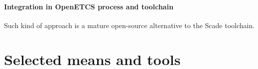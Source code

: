 \paragraph{Integration in OpenETCS process and toolchain}

Such kind of approach is a mature open-source alternative to the Scade toolchain.


\section{Selected means and tools}

\begin{comment}
To complete after decision meeting with a section for each tool with the following contents:

\begin{itemize}
\item description of the means or tools, references and links
\item added value for openETCS
\item for which tasks and how (input/output/actions) is the mean or tools used.
\end{itemize}
\end{comment}
